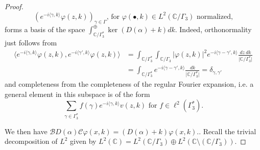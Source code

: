 \documentclass[reqno,12pt,letterpaper]{amsart}
\newcommand{\CC}{{\mathbb C}}
\numberwithin{equation}{section}
\begin{document}
\begin{proof}
\begin{equation}
\label{eq:basis}
(e^{-i \langle \gamma,k \rangle} \varphi(z,k))_{\gamma \in \Gamma}\text{, for }\varphi(\bullet,k) \in L^2(\CC/\Gamma_3)\text{ normalized,}
\end{equation}
forms a basis of the space $\int^{\oplus}_{\CC/\Gamma_3^*} \ker(D(\alpha)+k) dk$. Indeed, orthonormality just follows from 
\begin{equation}
\label{eq:orthonormality}
\begin{split}
 \langle e^{-i \langle \gamma,k \rangle} \varphi(z,k), e^{-i \langle \gamma',k \rangle} \varphi(z,k) \rangle 
 &= \int_{\CC/\Gamma_3^*} \int_{\CC/\Gamma_3} \vert \varphi(z,k)\vert^2 e^{-i\langle \gamma-\gamma',k \rangle} \frac{dz \ dk}{\vert \CC/\Gamma_3^*\vert} \\
&= \int_{\CC/\Gamma_3^*} e^{-i\langle \gamma-\gamma',k \rangle} \frac{dk}{\vert \CC/\Gamma_3^*\vert} = \delta_{\gamma,\gamma'}
 \end{split}
 \end{equation}
and completeness from the completeness of the regular Fourier expansion, i.e. a general element in this subspace is of the form 
\[ \sum_{\gamma \in \Gamma_3^*} f(\gamma) e^{-i \langle \gamma,k \rangle} v(z,k) \text{ for } f \in \ell^2(\Gamma_3^*).\]




We then have $\mathcal B D(\alpha)\mathcal C \varphi(x,k) = (D(\alpha)+k)\varphi(x,k).$.
Recall the trivial decomposition of $L^2$ given by $L^2(\CC) = L^2(\CC/\Gamma_3) \oplus L^2(\CC \setminus (\CC/\Gamma_3)).$


\end{proof}
\end{document}
